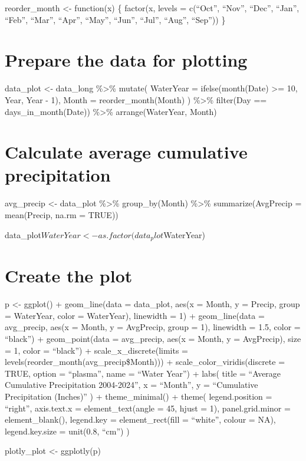 \documentclass[
]{book}
\theoremstyle{definition}
\theoremstyle{definition}
\theoremstyle{definition}
\theoremstyle{definition}
\theoremstyle{remark}
\begin{document}
reorder\_month \textless- function(x) \{
factor(x, levels = c(``Oct'', ``Nov'', ``Dec'', ``Jan'', ``Feb'', ``Mar'', ``Apr'', ``May'', ``Jun'', ``Jul'', ``Aug'', ``Sep''))
\}

\hypertarget{prepare-the-data-for-plotting}{%
\chapter{Prepare the data for plotting}\label{prepare-the-data-for-plotting}}

data\_plot \textless- data\_long \%\textgreater\%
mutate(
WaterYear = ifelse(month(Date) \textgreater= 10, Year, Year - 1),
Month = reorder\_month(Month)
) \%\textgreater\%
filter(Day == days\_in\_month(Date)) \%\textgreater\%
arrange(WaterYear, Month)

\hypertarget{calculate-average-cumulative-precipitation}{%
\chapter{Calculate average cumulative precipitation}\label{calculate-average-cumulative-precipitation}}

avg\_precip \textless- data\_plot \%\textgreater\%
group\_by(Month) \%\textgreater\%
summarize(AvgPrecip = mean(Precip, na.rm = TRUE))

data\_plot\(WaterYear <- as.factor(data_plot\)WaterYear)

\hypertarget{create-the-plot}{%
\chapter{Create the plot}\label{create-the-plot}}

p \textless- ggplot() +
geom\_line(data = data\_plot, aes(x = Month, y = Precip, group = WaterYear, color = WaterYear),
linewidth = 1) +
geom\_line(data = avg\_precip, aes(x = Month, y = AvgPrecip, group = 1),
linewidth = 1.5, color = ``black'') +
geom\_point(data = avg\_precip, aes(x = Month, y = AvgPrecip),
size = 1, color = ``black'') +
scale\_x\_discrete(limits = levels(reorder\_month(avg\_precip\$Month))) +
scale\_color\_viridis(discrete = TRUE, option = ``plasma'', name = ``Water Year'') +
labs(
title = ``Average Cumulative Precipitation 2004-2024'',
x = ``Month'',
y = ``Cumulative Precipitation (Inches)''
) +
theme\_minimal() +
theme(
legend.position = ``right'',
axis.text.x = element\_text(angle = 45, hjust = 1),
panel.grid.minor = element\_blank(),
legend.key = element\_rect(fill = ``white'', colour = NA),
legend.key.size = unit(0.8, ``cm'')
)

plotly\_plot \textless- ggplotly(p)

  
\end{document}
